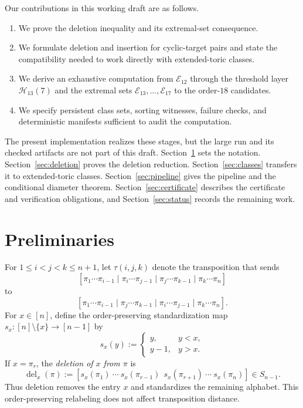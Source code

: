 \documentclass[11pt]{article}
\theoremstyle{definition}
\theoremstyle{remark}
\newcommand{\En}{\mathcal E}
\newcommand{\Hn}{\mathcal H}
\newcommand{\Del}{\operatorname{del}}
\begin{document}
Our contributions in this working draft are as follows.
\begin{enumerate}
  \item We prove the deletion inequality and its extremal-set consequence.
  \item We formulate deletion and insertion for cyclic-target pairs and state
        the compatibility needed to work directly with extended-toric classes.
  \item We derive an exhaustive computation from $\En_{12}$ through the
        threshold layer $\Hn_{13}(7)$ and the extremal sets
        $\En_{13},\ldots,\En_{17}$ to the order-$18$ candidates.
  \item We specify persistent class sets, sorting witnesses, failure checks,
        and deterministic manifests sufficient to audit the computation.
\end{enumerate}
The present implementation realizes these stages, but the large run and its
checked artifacts are not part of this draft.  Section~\ref{sec:preliminaries}
sets the notation.  Section~\ref{sec:deletion} proves the deletion reduction.
Section~\ref{sec:classes} transfers it to extended-toric classes.
Section~\ref{sec:pipeline} gives the pipeline and the conditional diameter
theorem.  Section~\ref{sec:certificate} describes the certificate and
verification obligations, and Section~\ref{sec:status} records the remaining
work.

\section{Preliminaries}\label{sec:preliminaries}

For $1\leq i<j<k\leq n+1$, let $\tau(i,j,k)$ denote the transposition
that sends
\[
 [\pi_1\cdots\pi_{i-1}\mid
   \pi_i\cdots\pi_{j-1}\mid
   \pi_j\cdots\pi_{k-1}\mid
   \pi_k\cdots\pi_n]
\]
to
\[
 [\pi_1\cdots\pi_{i-1}\mid
   \pi_j\cdots\pi_{k-1}\mid
   \pi_i\cdots\pi_{j-1}\mid
   \pi_k\cdots\pi_n].
\]
For $x\in[n]$, define the order-preserving standardization map
$s_x:[n]\setminus\{x\}\to[n-1]$ by
\[
  s_x(y):=
  \begin{cases}
    y, & y<x,\\
    y-1, & y>x.
  \end{cases}
\]
If $x=\pi_r$, the \emph{deletion of $x$ from $\pi$} is
\begin{equation}\label{eq:symbol-deletion}
  \Del_x(\pi):=
  [s_x(\pi_1)\ \cdots\ s_x(\pi_{r-1})\
   \ s_x(\pi_{r+1})\ \cdots\ s_x(\pi_n)]\in S_{n-1}.
\end{equation}
Thus deletion removes the entry $x$ and standardizes the remaining alphabet.
This order-preserving relabeling does not affect transposition distance.
\end{document}
